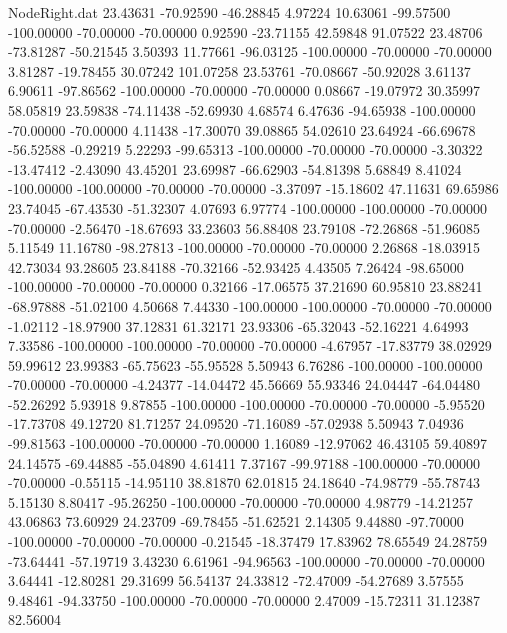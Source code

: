 \begin{filecontents}{NodeRight.dat}
  23.43631  -70.92590  -46.28845     4.97224   10.63061  -99.57500 -100.00000  -70.00000  -70.00000    0.92590  -23.71155   42.59848   91.07522
  23.48706  -73.81287  -50.21545     3.50393   11.77661  -96.03125 -100.00000  -70.00000  -70.00000    3.81287  -19.78455   30.07242  101.07258
  23.53761  -70.08667  -50.92028     3.61137    6.90611  -97.86562 -100.00000  -70.00000  -70.00000    0.08667  -19.07972   30.35997   58.05819
  23.59838  -74.11438  -52.69930     4.68574    6.47636  -94.65938 -100.00000  -70.00000  -70.00000    4.11438  -17.30070   39.08865   54.02610
  23.64924  -66.69678  -56.52588    -0.29219    5.22293  -99.65313 -100.00000  -70.00000  -70.00000   -3.30322  -13.47412   -2.43090   43.45201
  23.69987  -66.62903  -54.81398     5.68849    8.41024 -100.00000 -100.00000  -70.00000  -70.00000   -3.37097  -15.18602   47.11631   69.65986
  23.74045  -67.43530  -51.32307     4.07693    6.97774 -100.00000 -100.00000  -70.00000  -70.00000   -2.56470  -18.67693   33.23603   56.88408
  23.79108  -72.26868  -51.96085     5.11549   11.16780  -98.27813 -100.00000  -70.00000  -70.00000    2.26868  -18.03915   42.73034   93.28605
  23.84188  -70.32166  -52.93425     4.43505    7.26424  -98.65000 -100.00000  -70.00000  -70.00000    0.32166  -17.06575   37.21690   60.95810
  23.88241  -68.97888  -51.02100     4.50668    7.44330 -100.00000 -100.00000  -70.00000  -70.00000   -1.02112  -18.97900   37.12831   61.32171
  23.93306  -65.32043  -52.16221     4.64993    7.33586 -100.00000 -100.00000  -70.00000  -70.00000   -4.67957  -17.83779   38.02929   59.99612
  23.99383  -65.75623  -55.95528     5.50943    6.76286 -100.00000 -100.00000  -70.00000  -70.00000   -4.24377  -14.04472   45.56669   55.93346
  24.04447  -64.04480  -52.26292     5.93918    9.87855 -100.00000 -100.00000  -70.00000  -70.00000   -5.95520  -17.73708   49.12720   81.71257
  24.09520  -71.16089  -57.02938     5.50943    7.04936  -99.81563 -100.00000  -70.00000  -70.00000    1.16089  -12.97062   46.43105   59.40897
  24.14575  -69.44885  -55.04890     4.61411    7.37167  -99.97188 -100.00000  -70.00000  -70.00000   -0.55115  -14.95110   38.81870   62.01815
  24.18640  -74.98779  -55.78743     5.15130    8.80417  -95.26250 -100.00000  -70.00000  -70.00000    4.98779  -14.21257   43.06863   73.60929
  24.23709  -69.78455  -51.62521     2.14305    9.44880  -97.70000 -100.00000  -70.00000  -70.00000   -0.21545  -18.37479   17.83962   78.65549
  24.28759  -73.64441  -57.19719     3.43230    6.61961  -94.96563 -100.00000  -70.00000  -70.00000    3.64441  -12.80281   29.31699   56.54137
  24.33812  -72.47009  -54.27689     3.57555    9.48461  -94.33750 -100.00000  -70.00000  -70.00000    2.47009  -15.72311   31.12387   82.56004

\end{filecontents}
